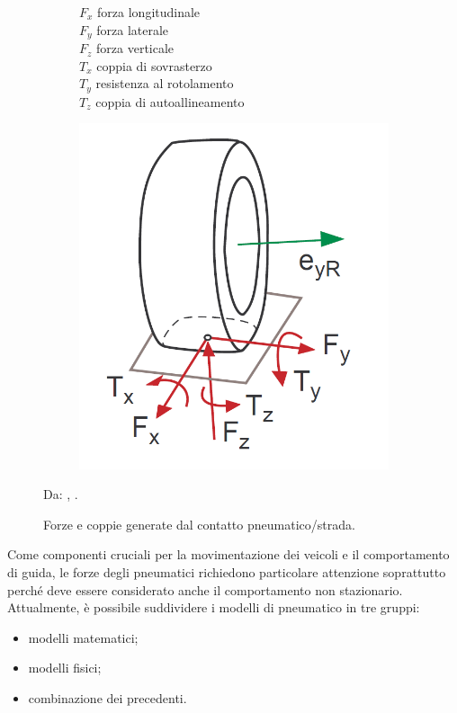 \begin{figure}[h!]
	\centering
	\begin{subfigure}{0.4\linewidth}
		$F_x$ \quad forza longitudinale\\
		$F_y$ \quad forza laterale\\
		$F_z$ \quad forza verticale\\
		$T_x$ \quad coppia di sovrasterzo\\
		$T_y$ \quad resistenza al rotolamento\\
		$T_z$ \quad coppia di autoallineamento
	\end{subfigure}
	\begin{subfigure}{0.4\linewidth}
		\centering
		\includegraphics[width=\linewidth]{Figures/tire_forces}
	\end{subfigure}
\caption{Forze e coppie generate dal contatto pneumatico/strada.}
Da: \citeauthor{Rill}, .
\label{tireforces}
\end{figure}
%
Come componenti cruciali per la movimentazione dei veicoli e il comportamento di guida, le forze degli pneumatici richiedono particolare attenzione soprattutto perché deve essere considerato anche il comportamento non stazionario. Attualmente, è possibile suddividere i modelli di pneumatico in tre gruppi:
\begin{itemize}
	\item modelli matematici;
	\item modelli fisici;
	\item combinazione dei precedenti.
\end{itemize}

